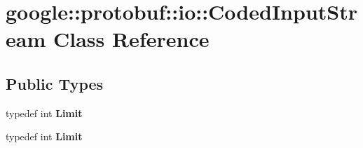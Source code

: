 \hypertarget{classgoogle_1_1protobuf_1_1io_1_1CodedInputStream}{}\section{google\+:\+:protobuf\+:\+:io\+:\+:Coded\+Input\+Stream Class Reference}
\label{classgoogle_1_1protobuf_1_1io_1_1CodedInputStream}
\subsection*{Public Types}
\begin{DoxyCompactItemize}
\item 
\mbox{\label{classgoogle_1_1protobuf_1_1io_1_1CodedInputStream_a068c8356a3528a6a5bc927ceb3dea1b2}} 
typedef int {\bfseries Limit}
\item 
\mbox{\label{classgoogle_1_1protobuf_1_1io_1_1CodedInputStream_a068c8356a3528a6a5bc927ceb3dea1b2}} 
typedef int {\bfseries Limit}
\end{DoxyCompactItemize}
